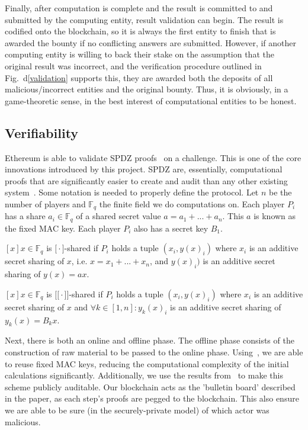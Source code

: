 \documentclass[journal,11pt]{IEEEtran}
\begin{document}
\par Finally, after computation is complete and the result is committed to and submitted by the computing entity, result validation can begin. The result is codified onto the blockchain, so it is always the first entity to finish that is awarded the bounty if no conflicting answers are submitted. However, if another computing entity is willing to back their stake on the assumption that the original result was incorrect, and the verification procedure outlined in Fig.~d\ref{validation} supports this, they are awarded both the deposits of all malicious/incorrect entities and the original bounty. Thus, it is obviously, in a game-theoretic sense, in the best interest of computational entities to be honest.

\subsection{Verifiability}

\par Ethereum is able to validate SPDZ proofs~\cite{Laud2014VerifiableMajority} on a challenge. This is one of the core innovations introduced by this project. SPDZ are, essentially, computational proofs that are significantly easier to create and audit than any other existing system~\cite{BaumEfficientAbort}. Some notation is needed to properly define the protocol. Let $n$ be the number of players and $\mathbb{F}_q$ the finite field we do computations on. Each player $P_i$ has a share $a_i \in \mathbb{F}_q$ of a shared secret value $a = a_1 + ... + a_n$. This $a$ is known as the fixed MAC key. Each player $P_i$ also has a secret key $B_1$. 

\par $[x] x \in \mathbb{F}_q$ is $\big[{}\cdot{}\big]$-shared if $P_i$ holds a tuple $(x_i,y(x)_i)$ where $x_i$ is an additive secret sharing of $x$, i.e. $x = x_1 + ... + x_n$, and $y(x)_i)$ is an additive secret sharing of $y(x) = ax$.

\par $[x] x \in \mathbb{F}_q$ is $\big[{}\big[{}\cdot{}\big]{}\big]$-shared if $P_i$ holds a tuple $(x_i,y(x)_i)$ where $x_i$ is an additive secret sharing of $x$ and $\forall{}k \in [1,n]:y_k(x)_i$ is an additive secret sharing of $y_k(x) = B_kx$.

\par Next, there is both an online and offline phase. The offline phase consists of the construction of raw material to be passed to the online phase. Using~\cite{Lindell2015EfficientSPDZ}, we are able to  reuse fixed MAC keys, reducing the computational complexity of the initial calculations significantly. Additionally, we use the results from~\cite{BaumBetterComputation} to make this scheme publicly auditable. Our blockchain acts as the 'bulletin board' described in the paper, as each step's proofs are pegged to the blockchain. This also ensure we are able to be sure (in the securely-private model) of which actor was malicious. 
\end{document}
